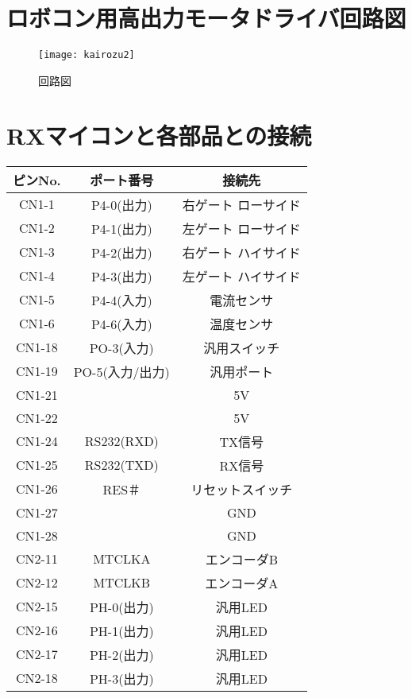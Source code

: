 \chapter{ロボコン用高出力モータドライバ回路図}
\newpage
\begin{figure}[H]
\begin{center}
\texttt{[image: kairozu2]}
\end{center}
\caption{回路図}
\label{fig:kairozu2}
\end{figure}

\chapter{RXマイコンと各部品との接続}
\begin{tabular}{|c|c|c|} \hline
ピンNo.   &ポート番号&接続先           \\ \hline \hline
CN1-1     &P4-0(出力)&右ゲート ローサイド\\ \hline
CN1-2     &P4-1(出力)&左ゲート ローサイド\\ \hline
CN1-3     &P4-2(出力)&右ゲート ハイサイド\\ \hline
CN1-4     &P4-3(出力)&左ゲート ハイサイド\\ \hline
CN1-5     &P4-4(入力)&      電流センサ \\ \hline
CN1-6     &P4-6(入力)&      温度センサ \\ \hline
CN1-18    &PO-3(入力)&    汎用スイッチ \\ \hline
CN1-19    &PO-5(入力/出力)&      汎用ポート \\ \hline
CN1-21    &          &              5V \\ \hline
CN1-22    &          &              5V \\ \hline
CN1-24    &RS232(RXD)&          TX信号 \\ \hline
CN1-25    &RS232(TXD)&          RX信号 \\ \hline
CN1-26    &RES＃     &リセットスイッチ \\ \hline
CN1-27    &          &             GND \\ \hline
CN1-28    &          &             GND \\ \hline \hline
CN2-11    &MTCLKA    &エンコーダB\\ \hline
CN2-12    &MTCLKB    &エンコーダA\\ \hline
CN2-15    &PH-0(出力)&汎用LED    \\ \hline
CN2-16    &PH-1(出力)&汎用LED    \\ \hline
CN2-17    &PH-2(出力)&汎用LED    \\ \hline
CN2-18    &PH-3(出力)&汎用LED    \\ \hline
\end{tabular}

